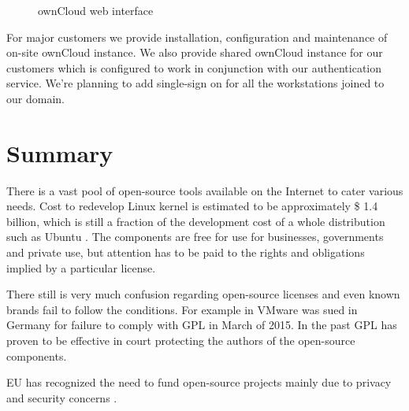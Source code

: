 \documentclass{article}
\begin{document}
\begin{figure}[!htb]
\centering
{}
\caption{ownCloud web interface}
\label{fig:owncloud}
\end{figure}

For major customers we provide installation,
configuration and maintenance of on-site ownCloud instance.
We also provide shared ownCloud instance
for our customers which is configured to work
in conjunction with our authentication service.
We're planning to add single-sign on
for all the workstations joined to our domain.



\section{Summary}

There is a vast pool of open-source tools available on the Internet
to cater various needs.
Cost to redevelop Linux kernel is estimated to be
approximately \$ 1.4 billion, which is still a fraction
of the development cost of a whole distribution such as Ubuntu
\cite{estimating-cost-of-linux-distro}.
The components are free for use for businesses, governments and
private use, but attention has to be paid to the rights
and obligations implied by a particular license.

There still is very much confusion regarding open-source licenses
and even known brands fail to follow the conditions.
For example in VMware was sued in Germany for failure to comply with GPL
\cite{vmware-sued} in March of 2015.
In the past GPL has proven to be effective in court protecting
the authors of the open-source components.

EU has recognized the need to fund open-source projects
mainly due to privacy and security concerns
\cite{eu-should-finance-open-source}.
\end{document}
